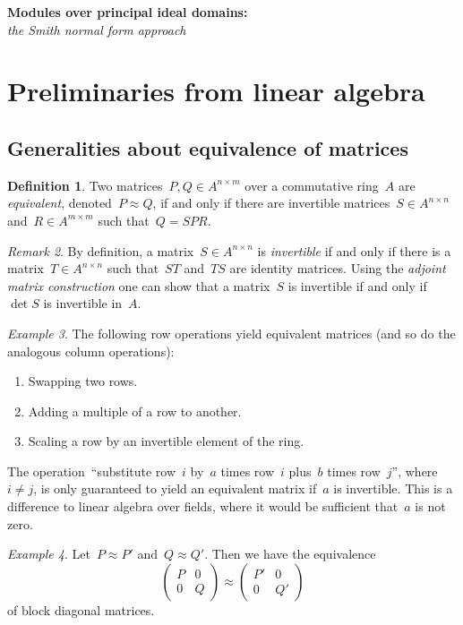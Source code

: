\documentclass[12pt]{scrartcl}
\theoremstyle{definition}
\newtheorem{definition}{Definition}[section]
\theoremstyle{plain}
\theoremstyle{remark}
\newtheorem{remark}[definition]{Remark}
\newtheorem{example}[definition]{Example}
\begin{document}
\begin{center}\huge\textbf{Modules over principal ideal domains:} \\ \emph{the Smith normal form approach}\end{center}

\section{Preliminaries from linear algebra}

\subsection{Generalities about equivalence of matrices}

\begin{definition}
    Two matrices~$P, Q \in A^{n \times m}$ over a commutative ring~$A$ are \emph{equivalent}, denoted~$P \approx Q$, if and only if there are invertible matrices~$S \in A^{n \times n}$ and~$R \in A^{m \times m}$ such that~$Q = SPR$.
\end{definition}

\begin{remark}
    By definition, a matrix~$S \in A^{n \times n}$ is \emph{invertible} if and only if there is a matrix~$T \in A^{n \times n}$ such that~$ST$ and~$TS$ are identity matrices. Using the \emph{adjoint matrix construction} one can show that a matrix~$S$ is invertible if and only if~$\det{S}$ is invertible in~$A$.
\end{remark}

\begin{example}\label{ex:elementary}
    The following row operations yield equivalent matrices (and so do the analogous column operations):
    \begin{enumerate}
        \item Swapping two rows.
        \item Adding a multiple of a row to another.
        \item Scaling a row by an invertible element of the ring.
    \end{enumerate}
    The operation~``substitute row~$i$ by~$a$ times row~$i$ plus~$b$ times row~$j$'', where~$i \neq j$, is only guaranteed to yield an equivalent matrix if~$a$ is invertible. This is a difference to linear algebra over fields, where it would be sufficient that~$a$ is not zero.
\end{example}

\begin{example}\label{ex:block}
    Let~$P \approx P'$ and~$Q \approx Q'$. Then we have the equivalence
    \[ \begin{pmatrix}P&0\\0&Q\end{pmatrix} \approx \begin{pmatrix}P'&0\\0&Q'\end{pmatrix} \]
    of block diagonal matrices.
\end{example}
\end{document}
